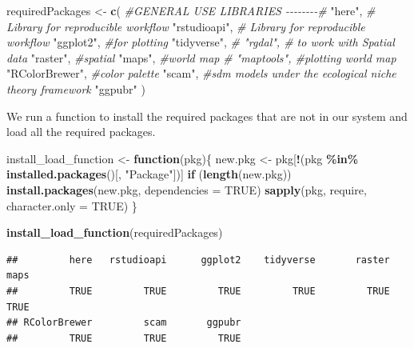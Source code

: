 \documentclass[
]{book}
\newenvironment{Shaded}{\begin{snugshade}}{\end{snugshade}}
\newcommand{\AttributeTok}[1]{\textcolor[rgb]{0.13,0.29,0.53}{#1}}
\newcommand{\CommentTok}[1]{\textcolor[rgb]{0.56,0.35,0.01}{\textit{#1}}}
\newcommand{\ConstantTok}[1]{\textcolor[rgb]{0.56,0.35,0.01}{#1}}
\newcommand{\ControlFlowTok}[1]{\textcolor[rgb]{0.13,0.29,0.53}{\textbf{#1}}}
\newcommand{\FunctionTok}[1]{\textcolor[rgb]{0.13,0.29,0.53}{\textbf{#1}}}
\newcommand{\NormalTok}[1]{#1}
\newcommand{\OtherTok}[1]{\textcolor[rgb]{0.56,0.35,0.01}{#1}}
\newcommand{\SpecialCharTok}[1]{\textcolor[rgb]{0.81,0.36,0.00}{\textbf{#1}}}
\newcommand{\StringTok}[1]{\textcolor[rgb]{0.31,0.60,0.02}{#1}}
\begin{document}
\begin{Shaded}
\begin{Highlighting}[]
\NormalTok{requiredPackages }\OtherTok{\textless{}{-}} \FunctionTok{c}\NormalTok{(}
  \CommentTok{\#GENERAL USE LIBRARIES {-}{-}{-}{-}{-}{-}{-}{-}\#}
  \StringTok{"here"}\NormalTok{, }\CommentTok{\# Library for reproducible workflow}
  \StringTok{"rstudioapi"}\NormalTok{,  }\CommentTok{\# Library for reproducible workflow}
  \StringTok{"ggplot2"}\NormalTok{, }\CommentTok{\#for plotting}
  \StringTok{"tidyverse"}\NormalTok{, }
  \CommentTok{\# "rgdal", \# to work with Spatial data}
  \StringTok{"raster"}\NormalTok{, }\CommentTok{\#spatial }
  \StringTok{"maps"}\NormalTok{, }\CommentTok{\#world map}
  \CommentTok{\# "maptools", \#plotting world map}
  \StringTok{"RColorBrewer"}\NormalTok{, }\CommentTok{\#color palette}
  \StringTok{"scam"}\NormalTok{, }\CommentTok{\#sdm models under the ecological niche theory framework}
  \StringTok{"ggpubr"}
\NormalTok{  )}
\end{Highlighting}
\end{Shaded}

We run a function to install the required packages that are not in our system and load all the required packages.

\begin{Shaded}
\begin{Highlighting}[]
\NormalTok{install\_load\_function }\OtherTok{\textless{}{-}} \ControlFlowTok{function}\NormalTok{(pkg)\{}
\NormalTok{  new.pkg }\OtherTok{\textless{}{-}}\NormalTok{ pkg[}\SpecialCharTok{!}\NormalTok{(pkg }\SpecialCharTok{\%in\%} \FunctionTok{installed.packages}\NormalTok{()[, }\StringTok{"Package"}\NormalTok{])]}
  \ControlFlowTok{if}\NormalTok{ (}\FunctionTok{length}\NormalTok{(new.pkg))}
    \FunctionTok{install.packages}\NormalTok{(new.pkg, }\AttributeTok{dependencies =} \ConstantTok{TRUE}\NormalTok{)}
  \FunctionTok{sapply}\NormalTok{(pkg, require, }\AttributeTok{character.only =} \ConstantTok{TRUE}\NormalTok{)}
\NormalTok{\}}

\FunctionTok{install\_load\_function}\NormalTok{(requiredPackages)}
\end{Highlighting}
\end{Shaded}

\begin{verbatim}
##         here   rstudioapi      ggplot2    tidyverse       raster         maps 
##         TRUE         TRUE         TRUE         TRUE         TRUE         TRUE 
## RColorBrewer         scam       ggpubr 
##         TRUE         TRUE         TRUE
\end{verbatim}
\end{document}
